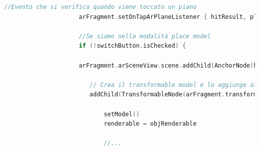 \documentclass[crop=false, class=book]{standalone}
\begin{document}
	\begin{center}
				\begin{minipage}{1.15\textwidth}
					\begin{lstlisting}[caption={Definizione Anchor in Plane Detection}, label={lst: Definizione Anchor in Plane Detection}, language=Kotlin]
					 //Evento che si verifica quando viene toccato un piano
            		 arFragment.setOnTapArPlaneListener { hitResult, plane, motionEvent ->

                	 //Se siamo nella modalità place model
                	 if (!switchButton.isChecked) {

                     arFragment.arSceneView.scene.addChild(AnchorNode(hitResult.createAnchor()).apply {
 
                        // Crea il transformable model e lo aggiunge all'anchor
                        addChild(TransformableNode(arFragment.transformationSystem).apply {

                            setModel()
                            renderable = objRenderable
                            
                            //...
					
				\end{lstlisting}
			\end{minipage}
		\end{center}
	\vspace{0.2cm}
\end{document}
